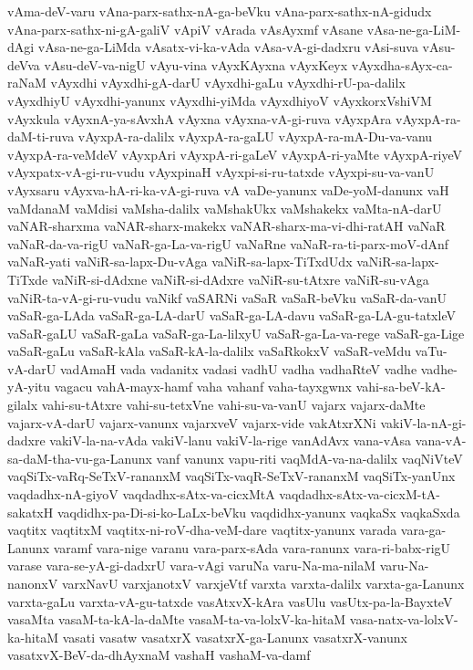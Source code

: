 {vAma-deV-varu
vAna-parx-sathx-nA-ga-beVku
vAna-parx-sathx-nA-gidudx
vAna-parx-sathx-ni-gA-galiV
vApiV
vArada
vAsAyxmf
vAsane
vAsa-ne-ga-LiM-dAgi
vAsa-ne-ga-LiMda
vAsatx-vi-ka-vAda
vAsa-vA-gi-dadxru
vAsi-suva
vAsu-deVva
vAsu-deV-va-nigU
vAyu-vina
vAyxKAyxna
vAyxKeyx
vAyxdha-sAyx-ca-raNaM
vAyxdhi
vAyxdhi-gA-darU
vAyxdhi-gaLu
vAyxdhi-rU-pa-dalilx
vAyxdhiyU
vAyxdhi-yanunx
vAyxdhi-yiMda
vAyxdhiyoV
vAyxkorxVshiVM
vAyxkula
vAyxnA-ya-sAvxhA
vAyxna
vAyxna-vA-gi-ruva
vAyxpAra
vAyxpA-ra-daM-ti-ruva
vAyxpA-ra-dalilx
vAyxpA-ra-gaLU
vAyxpA-ra-mA-Du-va-vanu
vAyxpA-ra-veMdeV
vAyxpAri
vAyxpA-ri-gaLeV
vAyxpA-ri-yaMte
vAyxpA-riyeV
vAyxpatx-vA-gi-ru-vudu
vAyxpinaH
vAyxpi-si-ru-tatxde
vAyxpi-su-va-vanU
vAyxsaru
vAyxva-hA-ri-ka-vA-gi-ruva
vA‌
vaDe-yanunx
vaDe-yoM-danunx
vaH
vaMdanaM
vaMdisi
vaMsha-dalilx
vaMshakUkx
vaMshakekx
vaMta-nA-darU
vaNAR-sharxma
vaNAR-sharx-makekx
vaNAR-sharx-ma-vi-dhi-ratAH
vaNaR
vaNaR-da-va-rigU
vaNaR-ga-La-va-rigU
vaNaRne
vaNaR-ra-ti-parx-moV-dAnf
vaNaR-yati
vaNiR-sa-lapx-Du-vAga
vaNiR-sa-lapx-TiTxdUdx
vaNiR-sa-lapx-TiTxde
vaNiR-si-dAdxne
vaNiR-si-dAdxre
vaNiR-su-tAtxre
vaNiR-su-vAga
vaNiR-ta-vA-gi-ru-vudu
vaNikf
vaSARNi
vaSaR
vaSaR-beVku
vaSaR-da-vanU
vaSaR-ga-LAda
vaSaR-ga-LA-darU
vaSaR-ga-LA-davu
vaSaR-ga-LA-gu-tatxleV
vaSaR-gaLU
vaSaR-gaLa
vaSaR-ga-La-lilxyU
vaSaR-ga-La-va-rege
vaSaR-ga-Lige
vaSaR-gaLu
vaSaR-kAla
vaSaR-kA-la-dalilx
vaSaRkokxV
vaSaR-veMdu
vaTu-vA-darU
vadAmaH
vada
vadanitx
vadasi
vadhU
vadha
vadhaRteV
vadhe
vadhe-yA-yitu
vagacu
vahA-mayx-hamf
vaha
vahanf
vaha-tayxgwnx
vahi-sa-beV-kA-gilalx
vahi-su-tAtxre
vahi-su-tetxVne
vahi-su-va-vanU
vajarx
vajarx-daMte
vajarx-vA-darU
vajarx-vanunx
vajarxveV
vajarx-vide
vakAtxrXNi
vakiV-la-nA-gi-dadxre
vakiV-la-na-vAda
vakiV-lanu
vakiV-la-rige
vanAdAvx
vana-vAsa
vana-vA-sa-daM-tha-vu-ga-Lanunx
vanf
vanunx
vapu-riti
vaqMdA-va-na-dalilx
vaqNiVteV
vaqSiTx-vaRq-SeTxV-rananxM
vaqSiTx-vaqR-SeTxV-rananxM
vaqSiTx-yanUnx
vaqdadhx-nA-giyoV
vaqdadhx-sAtx-va-cicxMtA
vaqdadhx-sAtx-va-cicxM-tA-sakatxH
vaqdidhx-pa-Di-si-ko-LaLx-beVku
vaqdidhx-yanunx
vaqkaSx
vaqkaSxda
vaqtitx
vaqtitxM
vaqtitx-ni-roV-dha-veM-dare
vaqtitx-yanunx
varada
vara-ga-Lanunx
varamf
vara-nige
varanu
vara-parx-sAda
vara-ranunx
vara-ri-babx-rigU
varase
vara-se-yA-gi-dadxrU
vara-vAgi
varuNa
varu-Na-ma-nilaM
varu-Na-nanonxV
varxNavU
varxjanotxV
varxjeVtf
varxta
varxta-dalilx
varxta-ga-Lanunx
varxta-gaLu
varxta-vA-gu-tatxde
vasAtxvX-kAra
vasUlu
vasUtx-pa-la-BayxteV
vasaMta
vasaM-ta-kA-la-daMte
vasaM-ta-va-lolxV-ka-hitaM
vasa-natx-va-lolxV-ka-hitaM
vasati
vasatw
vasatxrX
vasatxrX-ga-Lanunx
vasatxrX-vanunx
vasatxvX-BeV-da-dhAyxnaM
vashaH
vashaM-va-damf
}
